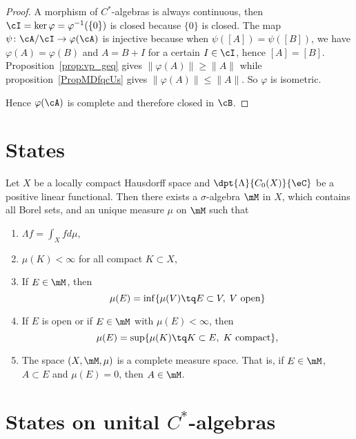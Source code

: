 \begin{proof}
	A morphism of $C^*$-algebras is always continuous,%
	then $\cI=\ker\varphi=\varphi^{-1}(\{ 0 \})$ is closed because $\{ 0 \}$ is closed. The map $\psi\colon \cA/\cI\to \varphi(\cA)$ is injective because when $\psi([A])=\psi([B])$, we have $\varphi(A)=\varphi(B)$ and $A=B+I$ for a certain $I\in\cI$, hence $[A]=[B]$. Proposition~\ref{prop:vp_geq} gives $\| \varphi(A) \|\geq\| A \|$ while proposition~\ref{PropMDfqcUs} gives $\| \varphi(A) \|\leq \| A \|$. So $\varphi$ is isometric.

	Hence $\varphi(\cA)$ is complete and therefore closed in $\cB$.
\end{proof}


\section{States}

\begin{theorem}
	Let $X$ be a locally compact Hausdorff space and $\dpt{\Lambda}{C_0(X)}{\eC}$ be a positive linear functional. Then there exists a $\sigma$-algebra $\mM$ in $X$, which contains all Borel sets, and an unique measure $\mu$ on $\mM$ such that

	\begin{enumerate}
		\item $\Lambda f=\int_Xfd\mu$,
		\item $\mu(K)<\infty$ for all compact $K\subset X$,
		\item If $E\in\mM$, then
		      \[
			      \mu(E)=\inf\{ \mu(V)\tq E\subset V,\; V\textrm{ open} \}
		      \]
		\item If $E$ is open or if $E\in\mM$ with $\mu(E)<\infty$, then
		      \[
			      \mu(E)=\sup\{ \mu(K)\tq K\subset E,\; K\textrm{ compact} \},
		      \]
		\item The space $(X,\mM,\mu)$ is a complete measure space. That is, if $E\in\mM$, $A\subset E$ and $\mu(E)=0$, then $A\in\mM$.

	\end{enumerate}
\end{theorem}

\section{States on unital \texorpdfstring{$C^*$}{C*}-algebras}

